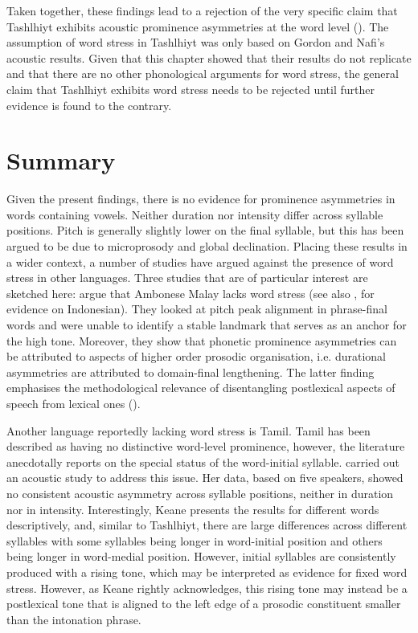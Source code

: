 Taken together, these findings lead to a rejection of the very specific claim that Tashlhiyt exhibits acoustic prominence asymmetries at the word level (\citealt{GordonNafi2012}). The assumption of word stress in Tashlhiyt was only based on Gordon and Nafi’s acoustic results. Given that this chapter showed that their results do not replicate and that there are no other phonological arguments for word stress, the general claim that Tashlhiyt exhibits word stress needs to be rejected until further evidence is found to the contrary.

\section{Summary}\label{sec:4.4}
Given the present findings, there is no evidence for prominence asymmetries in words containing vowels. Neither duration nor intensity differ across syllable positions. Pitch is generally slightly lower on the final syllable, but this has been argued to be due to microprosody and global declination. Placing these results in a wider context, a number of studies have argued against the presence of word stress in other languages. Three studies that are of particular interest are sketched here: \citet{MaskGussenhoven2016} argue that Ambonese Malay lacks word stress (see also \citealt{GoedemansZanten2007}, for evidence on Indonesian). They looked at pitch peak alignment in phrase-final words and were unable to identify a stable landmark that serves as an anchor for the high tone. Moreover, they show that phonetic prominence asymmetries can be attributed to aspects of higher order prosodic organisation, i.e. durational asymmetries are attributed to domain-final lengthening. The latter finding emphasises the methodological relevance of disentangling postlexical aspects of speech from lexical ones (\citealt{Gordon2014,RoettgerGordon.underreview}). 

Another language reportedly lacking word stress is Tamil. Tamil has been described as having no distinctive word-level prominence, however, the literature anecdotally reports on the special status of the word-initial syllable. \citet{Keane2006} carried out an acoustic study to address this issue. Her data, based on five speakers, showed no consistent acoustic asymmetry across syllable positions, neither in duration nor in intensity. Interestingly, Keane presents the results for different words descriptively, and, similar to Tashlhiyt, there are large differences across different syllables with some syllables being longer in word-initial position and others being longer in word-medial position. However, initial syllables are consistently produced with a rising tone, which may be interpreted as evidence for fixed word stress. However, as Keane rightly acknowledges, this rising tone may instead be a postlexical tone that is aligned to the left edge of a prosodic constituent smaller than the intonation phrase.

